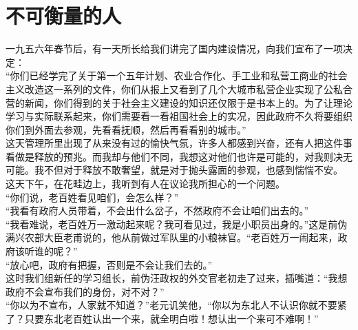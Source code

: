 \fancyhead[RO]{} %
\fancyhead[LE]{} %
\chapter*{不可衡量的人}
\thispagestyle{empty}
一九五六年春节后，有一天所长给我们讲完了国内建设情况，向我们宣布了一项决定：\\

“你们已经学完了关于第一个五年计划、农业合作化、手工业和私营工商业的社会主义改造这一系列的文件，你们从报上又看到了几个大城市私营企业实现了公私合营的新闻，你们得到的关于社会主义建设的知识还仅限于是书本上的。为了让理论学习与实际联系起来，你们需要看一看祖国社会上的实况，因此政府不久将要组织你们到外面去参观，先看看抚顺，然后再看看别的城市。”\\

这天管理所里出现了从来没有过的愉快气氛，许多人都感到兴奋，还有人把这件事看做是释放的预兆。而我却与他们不同，我想这对他们也许是可能的，对我则决无可能。我不但对于释放不敢奢望，就是对于抛头露面的参观，也感到惴惴不安。\\

这天下午，在花畦边上，我听到有人在议论我所担心的一个问题。\\

“你们说，老百姓看见咱们，会怎么样？”\\

“我看有政府人员带着，不会出什么岔子，不然政府不会让咱们出去的。”\\

“我看难说，老百姓万一激动起来呢？我可看见过，我是小职员出身的。”这是前伪满兴农部大臣老甫说的，他从前做过军队里的小粮袜官。“老百姓万一闹起来，政府该听谁的呢？”\\

“放心吧，政府有把握，否则是不会让我们去的。”\\

这时我们组新任的学习组长，前伪汪政权的外交官老初走了过来，插嘴道：“我想政府不会宣布我们的身份，对不对？”\\

“你以为不宣布，人家就不知道？”老元讥笑他，“你以为东北人不认识你就不要紧了？只要东北老百姓认出一个来，就全明白啦！想认出一个来可不难啊！”\\

